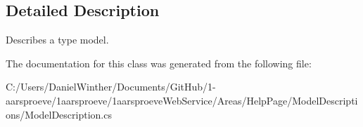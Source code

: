 \subsection{Detailed Description}
Describes a type model. 



The documentation for this class was generated from the following file\+:\begin{DoxyCompactItemize}
\item 
C\+:/\+Users/\+Daniel\+Winther/\+Documents/\+Git\+Hub/1-\/aarsproeve/1aarsproeve/1aarsproeve\+Web\+Service/\+Areas/\+Help\+Page/\+Model\+Descriptions/Model\+Description.\+cs\end{DoxyCompactItemize}
